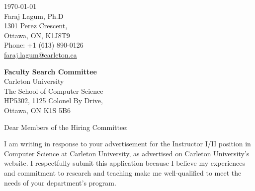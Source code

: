 \documentclass[letterpaper,11pt,oneside]{article}
\newcommand{\ignore}[1]{}
\begin{document}
\ignore
{

}

\clearpage
\setlength\parindent{0cm}



\begin{flushright}
 \today                           \\
 \vspace{1em}                              
 Faraj Lagum, Ph.D            \\
 1301 Perez Crescent,                       \\
 Ottawa, ON, K1J8T9   \\
 Phone: +1 (613) 890-0126        \\
\href{mailto:faraj.lagum@carleton.ca}{faraj.lagum@carleton.ca}  \\ %
\end{flushright}


\begin{flushleft}
 \textbf{Faculty Search Committee}         \\
 Carleton University
 \\
The School of Computer Science                  \\
HP5302, 1125 Colonel By Drive,  \\
Ottawa, ON K1S 5B6
\end{flushleft}

\vspace{2em}

Dear Members of the Hiring Committee: \\
\vspace{1em}
\onehalfspacing

I am writing in response to your advertisement for the Instructor I/II position in Computer Science at Carleton University, as advertised on Carleton University's website. I respectfully submit this application because I believe my experiences and commitment to research and teaching make me well-qualified to meet the needs of your department's program.

\vspace{1em}
\end{document}
